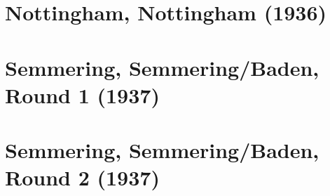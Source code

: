 \documentclass[11pt]{article}
\begin{document}
\clearpage



\clearpage



\clearpage

\section{Nottingham, Nottingham (1936)}


\clearpage



\clearpage



\clearpage



\clearpage



\clearpage



\clearpage



\clearpage



\clearpage



\clearpage



\clearpage



\clearpage



\clearpage



\clearpage



\clearpage

\section{Semmering, Semmering/Baden, Round 1 (1937)}


\clearpage

\section{Semmering, Semmering/Baden, Round 2 (1937)}

\end{document}
